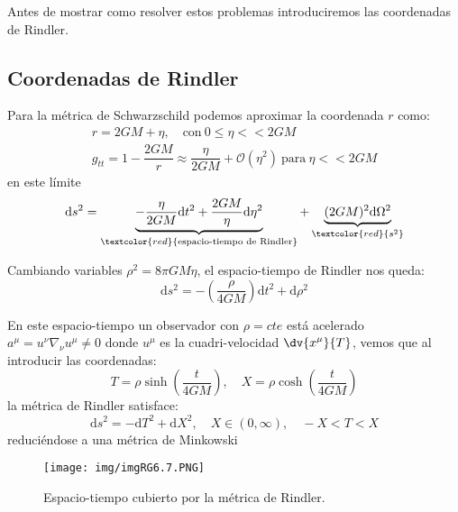 \documentclass[../main]{subfiles}
\begin{document}
\begin{adjustwidth}{0pt}{-100pt}
Antes de mostrar como resolver estos problemas introduciremos las coordenadas de Rindler.

\subsection{Coordenadas de Rindler}

Para la métrica de Schwarzschild podemos aproximar la coordenada $r$ como:
\begin{equation}
    \begin{split}
        r=2GM+\eta,\quad \text{con} \ 0\leq \eta << 2GM\\
        g_{tt}=1-\dfrac{2GM}{r}\approx \dfrac{\eta}{2GM}+\mathcal{O}(\eta^2) \ \text{para} \ \eta << 2GM
    \end{split}
\end{equation}
en este límite 
\begin{equation}
    \mathrm{d}s^2=\underbrace{-\dfrac{\eta}{2GM}\mathrm{d}t^2+\dfrac{2GM}{\eta}\mathrm{d}\eta^2}_{\textcolor{red}{\text{espacio-tiempo de Rindler}}}+\underbrace{(2GM)^2\mathrm{d}\Omega^2}_{\textcolor{red}{s^2}}
\end{equation}

Cambiando variables $\rho^2=8\pi GM \eta$, el espacio-tiempo de Rindler nos queda:
\begin{equation}
    \mathrm{d}s^2=-\left(\dfrac{\rho}{4GM}\right)\mathrm{d}t^2+\mathrm{d}\rho^2
\end{equation}

En este espacio-tiempo un observador con $\rho=cte$ está acelerado $a^{\mu}=u^{\nu}\nabla_{\nu}u^{\mu}\neq 0$ donde $u^{\mu}$ es la cuadri-velocidad $\displaystyle\dv{x^{\mu}}{T}$, vemos que al introducir las coordenadas:
\begin{equation}
    T=\rho \sinh\left(\dfrac{t}{4GM}\right),\quad X=\rho \cosh\left(\dfrac{t}{4GM}\right)
\end{equation}
la métrica de Rindler satisface:
\begin{equation}
    \mathrm{d}s^2=-\mathrm{d}T^2+\mathrm{d}X^2,\quad X\in (0, \infty), \quad -X< T < X
\end{equation}
reduciéndose a una métrica de Minkowski
\begin{figure}[H]
    \begin{adjustwidth}{0pt}{-100pt}
    \begin{center}
        \texttt{[image: img/imgRG6.7.PNG]}
        \caption{Espacio-tiempo cubierto por la métrica de Rindler.}
    \end{center}
    \end{adjustwidth}
\end{figure}


\end{adjustwidth}
\end{document}
